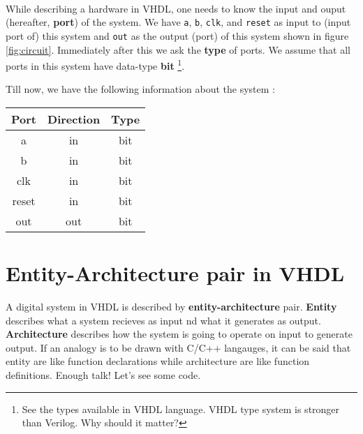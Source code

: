 \documentclass[a4paper,10pt]{article}
\begin{document}
\paragraph{}

  While describing a hardware in VHDL, one needs to know the input and ouput
  (hereafter, \textbf{port}) of the system. We have \texttt{a}, \texttt{b},
  \texttt{clk}, and \texttt{reset} as input to (input port of) this system and
  \texttt{out} as the output (port) of this system shown in figure
  \ref{fig:circuit}. Immediately after this we ask
  the \textbf{type} of ports. We assume that all ports in this system have data-type
  \textbf{bit} \footnote{See the types available in VHDL language. VHDL type
  system is stronger than Verilog. Why should it matter?}.

  Till now, we have the following information about the system :

  \begin{table}[h]
    \centering
  \begin{tabular}{c|c|c}
    Port & Direction & Type \\
    \hline 
    a & in & bit \\
    b & in & bit \\ 
    clk & in & bit \\ 
    reset & in & bit \\ 
    out & out & bit \\
    \hline
  \end{tabular}
\end{table}

\section{Entity-Architecture pair in VHDL}
  
A digital system in VHDL is described by \textbf{entity-architecture} pair.
\textbf{Entity} describes what a system recieves as input nd what it generates
as output. \textbf{Architecture} describes how the system is going to operate on
input to generate output. If an analogy is to be drawn with C/C++ langauges, it
can be said that entity are like function declarations while architecture are
like function definitions. Enough talk! Let's see some code.
\end{document}
